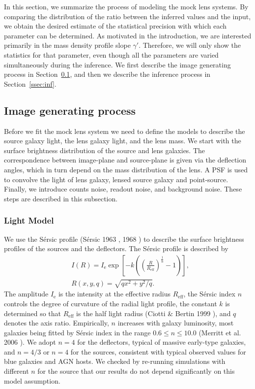 \documentclass[a4paper,11pt]{article}
\begin{document}
{In this section, we summarize the process of modeling the mock lens
systems. By comparing the distribution of the ratio between the
inferred values and the input, we obtain the desired estimate of the
statistical precision with which each parameter can be determined. As
motivated in the introduction, we are interested primarily in the mass
density profile slope $\gamma'$. Therefore, we will only show the
statistics for that parameter, even though all the parameters are
varied simultaneously during the inference. We first describe the
image generating process in Section~\ref{ssec:image}, and then we
describe the inference process in Section~\ref{ssec:inf}.

\subsection{Image generating process}
\label{ssec:image}

Before we fit the mock lens system we need to define the models to
describe the source galaxy light, the lens galaxy light, and the lens
mass. We start with the surface brightness distribution of the
source and lens galaxies. The correspondence between image-plane and source-plane
 is given via the deflection angles, which in turn depend on the mass distribution of the lens.
 A PSF is used to convolve the light of lens galaxy, lensed source galaxy and point-source.
 Finally, we introduce counts noise, readout noise, and background noise.
 These steps are described in this subsection.

\subsubsection{Light Model}

We use the S\'ersic profile (S{\'e}rsic 1963 \cite{1963BAAA....6...41S}, 1968 \cite{1968adga.book.....S})
to describe the surface brightness profiles of the sources and the deflectors. The
S\'ersic profile is described by %
%
\begin{eqnarray}
   \label{eq:Intensity}
   &I(R) = I_{\mathrm{e}} \exp\left[-k\left(\left(\frac{R}{R_{\mathrm{eff}}}\right)^{\frac{1}{\mathrm{n}}}-1\right)\right] ,\\
   &R(x,y,q) = \sqrt{qx^2+y^2/q}.
\end{eqnarray}
%
The amplitude $I_{\mathrm{e}}$ is the intensity at the effective
radius $R_{\mathrm{eff}}$, the S\'ersic index $n$ controls the degree
of curvature of the radial light profile, the constant $k$ is determined so that
$R_{\mathrm{eff}}$ is the half light radius (Ciotti \& Bertin 1999 \cite{1999A&A...352..447C}),
 and $q$ denotes the axis ratio. Empirically, $n$ increases with galaxy luminosity, most
galaxies being fitted by S\'ersic index in the range $0.6 \le n
\le 10.0$ (Merritt et al. 2006 \cite{2006AJ....132.2685M}). We adopt $n=4$ for the
deflectors, typical of massive early-type galaxies, and $n=4/3$ or
$n=4$ for the sources, consistent with typical observed values for
blue galaxies and AGN hosts. We checked by re-running simulations with
different $n$ for the source that our results do not depend
significantly on this model assumption.

}
\end{document}

